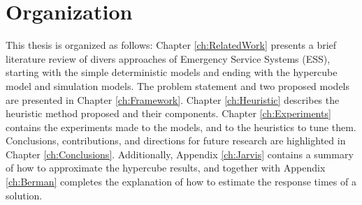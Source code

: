 \section{Organization}
This thesis is organized as follows:
Chapter \ref{ch:RelatedWork}
presents a brief literature review
of divers approaches of Emergency Service Systems (ESS),
starting with the simple deterministic models
and ending with the hypercube model and simulation models.
The problem statement
and two proposed models are presented in Chapter \ref{ch:Framework}.
Chapter \ref{ch:Heuristic} describes the heuristic method proposed
and their components.
Chapter \ref{ch:Experiments} contains
the experiments made to the models,
and to the heuristics to tune them.
Conclusions, contributions, 
and directions for future research
are highlighted in Chapter \ref{ch:Conclusions}.
Additionally, Appendix \ref{ch:Jarvis}
contains a summary of how to approximate the hypercube results,
and together with Appendix \ref{ch:Berman}
completes the explanation of how to estimate
the response times of a solution.
